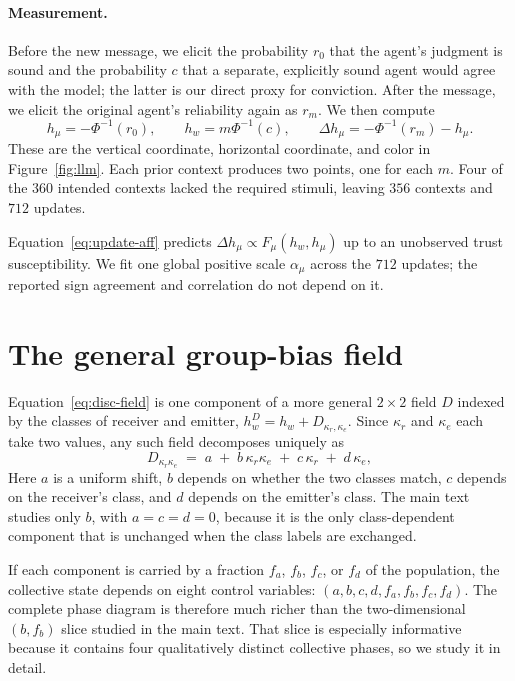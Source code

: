 \documentclass{article}
\newcommand{\hw}{h_{w}}
\newcommand{\hmu}{h_{\mu}}
\newcommand{\Fmu}{F_{\mu}}
\begin{document}
\paragraph{Measurement.} Before the new message, we elicit the probability $r_0$
that the agent's judgment is sound and the probability $c$ that a separate,
explicitly sound agent would agree with the model; the latter is our direct proxy
for conviction. After the message, we elicit the original agent's reliability
again as $r_m$. We then compute
%
\begin{equation}
  \hmu=-\Phi^{-1}(r_0),
  \qquad
  \hw=m\Phi^{-1}(c),
  \qquad
  \Delta\hmu=-\Phi^{-1}(r_m)-\hmu.
  \label{eq:trust-readout}
\end{equation}
%
These are the vertical coordinate, horizontal coordinate, and color in
Figure~\ref{fig:llm}. Each prior context produces two points, one for each $m$.
Four of the $360$ intended contexts lacked the required stimuli, leaving $356$
contexts and $712$ updates.

Equation~\eqref{eq:update-aff} predicts
$\Delta\hmu\propto\Fmu(\hw,\hmu)$ up to an unobserved trust susceptibility. We
fit one global positive scale $\alpha_\mu$ across the $712$ updates; the reported
sign agreement and correlation do not depend on it.


\section{The general group-bias field}
\label{app:cases}

Equation~\eqref{eq:disc-field} is one component of a more general $2\times2$ field $D$ indexed by the classes of receiver and emitter,
$\hw^{D}=\hw+D_{\kappa_r,\kappa_e}$. Since $\kappa_r$ and $\kappa_e$ each take
two values, any such field decomposes uniquely as
%
\begin{equation}
  D_{\kappa_r\kappa_e} \;=\; a \;+\; b\,\kappa_r\kappa_e
                            \;+\; c\,\kappa_r \;+\; d\,\kappa_e ,
  \label{eq:field-basis}
\end{equation}
%
Here $a$ is a uniform shift, $b$ depends on whether the two classes match, $c$
depends on the receiver's class, and $d$ depends on the emitter's class. The main
text studies only $b$, with $a=c=d=0$, because it is the only class-dependent
component that is unchanged when the class labels are exchanged.

If each component is carried by a fraction $f_a$, $f_b$, $f_c$, or $f_d$ of the
population, the collective state depends on eight control variables:
$(a,b,c,d,f_a,f_b,f_c,f_d)$. The complete phase diagram is therefore much richer
than the two-dimensional $(b,f_b)$ slice studied in the main text. That slice is
especially informative because it contains four qualitatively distinct
collective phases, so we study it in detail.
\end{document}
